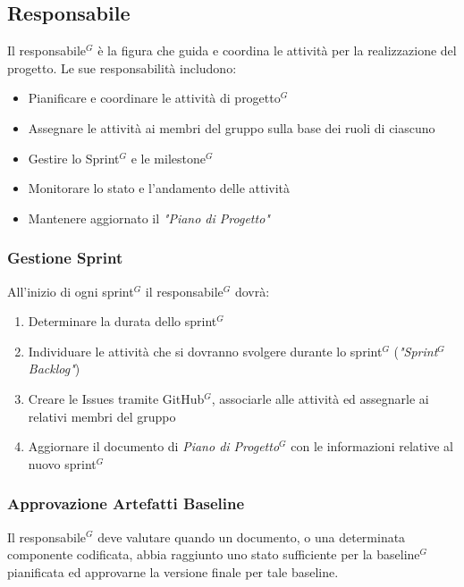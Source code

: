 \documentclass[a4paper,10pt]{article}
\begin{document}
\subsection{Responsabile}
Il responsabile$^G$ è la figura che guida e coordina le attività per la realizzazione del progetto. Le sue responsabilità includono:
\begin{itemize}
  \item Pianificare e coordinare le attività di progetto$^G$
  \item Assegnare le attività ai membri del gruppo sulla base dei ruoli di ciascuno
  \item Gestire lo Sprint$^G$ e le milestone$^G$
  \item Monitorare lo stato e l'andamento delle attività
  \item Mantenere aggiornato il \textit{"Piano di Progetto"}
\end{itemize}
\subsubsection{Gestione Sprint}
All'inizio di ogni sprint$^G$ il responsabile$^G$ dovrà:
\begin{enumerate}
  \item Determinare la durata dello sprint$^G$
  \item Individuare le attività che si dovranno svolgere durante lo sprint$^G$ (\textit{"Sprint$^G$ Backlog"})
  \item Creare le Issues tramite GitHub$^G$, associarle alle attività ed assegnarle ai relativi membri del gruppo  
  \item Aggiornare il documento di \textit{Piano di Progetto$^G$} con le informazioni relative al nuovo sprint$^G$
\end{enumerate}
\subsubsection{Approvazione Artefatti Baseline}
Il responsabile$^G$ deve valutare quando un documento, o una determinata componente codificata, abbia raggiunto
uno stato sufficiente per la baseline$^G$ pianificata ed approvarne la versione finale per tale baseline.
\end{document}
